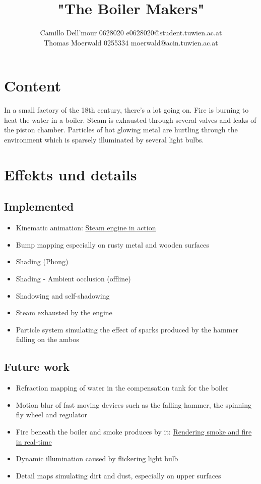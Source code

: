 \documentclass{scrartcl}
\title{"The Boiler Makers"}
\author{Camillo Dell'mour 0628020 e0628020@student.tuwien.ac.at\\ Thomas Moerwald 0255334 moerwald@acin.tuwien.ac.at}
\begin{document}
\maketitle

\section{Content}
In a small factory of the 18th century, there's a lot going on. Fire is burning to heat the water in a boiler. Steam is exhausted through several valves and leaks of the piston chamber. Particles of hot glowing metal are hurtling through the environment which is sparsely illuminated by several light bulbs.

\section{Effekts und details}
\subsection*{Implemented}
\begin{itemize}
	\item Kinematic animation: \href{http://en.wikipedia.org/wiki/File:Steam_engine_in_action.gif}{Steam engine in action}
	\item Bump mapping especially on rusty metal and wooden surfaces \cite{moeller1999realtime, dietrich2000hardware}
	\item Shading (Phong) \cite{phong1975illumination}
	\item Shading - Ambient occlusion (offline) \cite{hoberock2000high}
	\item Shadowing and self-shadowing \cite{nagy2000realtime, king2000ground}
	\item Steam exhausted by the engine \cite{van2000building}
	\item Particle system simulating the effect of sparks produced by the hammer falling on the ambos \cite{van2000building}
\end{itemize}
\subsection*{Future work}
\begin{itemize}
	\item Refraction mapping of water in the compensation tank for the boiler \cite{vlachos2000refraction}
	\item Motion blur of fast moving devices such as the falling hammer, the spinning fly wheel and regulator \cite{rosado2007motion}
	\item Fire beneath the boiler and smoke produces by it: \href{http://graphics.ethz.ch/teaching/former/imagesynthesis_06/miniprojects/p3/index.html}{Rendering smoke and fire in real-time}
	\item Dynamic illumination caused by flickering light bulb
	\item Detail maps simulating dirt and dust, especially on upper surfaces
\end{itemize}

% 
 
\end{document}
